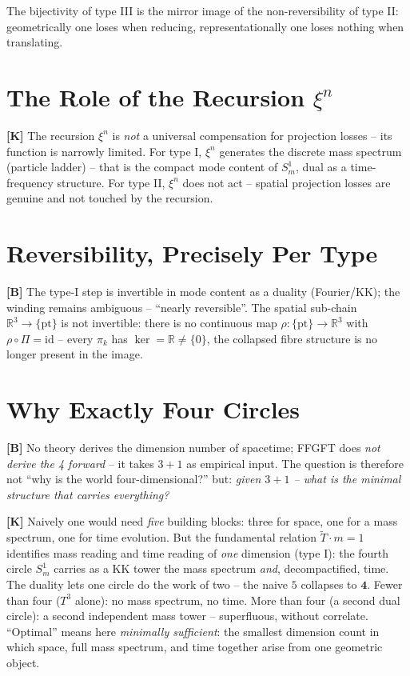The bijectivity of type III is the mirror image of the non-reversibility of type
II: geometrically one loses when reducing, representationally one loses nothing
when translating.

\section{The Role of the Recursion $\xi^n$}

\textbf{[K]} The recursion $\xi^n$ is \emph{not} a universal compensation for
projection losses -- its function is narrowly limited. For type I, $\xi^n$
generates the discrete mass spectrum (particle ladder) -- that is the compact mode
content of $S^1_m$, dual as a time-frequency structure. For type II, $\xi^n$ does
not act -- spatial projection losses are genuine and not touched by the recursion.

\section{Reversibility, Precisely Per Type}

\textbf{[B]} The type-I step is invertible in mode content as a duality
(Fourier/KK); the winding remains ambiguous -- ``nearly reversible''. The spatial
sub-chain $\mathbb{R}^3\to\{\mathrm{pt}\}$ is not invertible: there is no
continuous map $\rho:\{\mathrm{pt}\}\to\mathbb{R}^3$ with $\rho\circ\Pi=\mathrm{id}$
-- every $\pi_k$ has $\ker=\mathbb{R}\neq\{0\}$, the collapsed fibre structure is
no longer present in the image.

\section{Why Exactly Four Circles}

\textbf{[B]} No theory derives the dimension number of spacetime; FFGFT does
\emph{not derive the 4 forward} -- it takes $3+1$ as empirical input. The
question is therefore not ``why is the world four-dimensional?'' but: \emph{given
$3+1$ -- what is the minimal structure that carries everything?}

\textbf{[K]} Naively one would need \emph{five} building blocks: three for space,
one for a mass spectrum, one for time evolution. But the fundamental relation
$\tilde T\cdot m=1$ identifies mass reading and time reading of \emph{one}
dimension (type I): the fourth circle $S^1_m$ carries as a KK tower the mass
spectrum \emph{and}, decompactified, time. The duality lets one circle do the
work of two -- the naive $5$ collapses to $\mathbf{4}$. Fewer than four ($T^3$
alone): no mass spectrum, no time. More than four (a second dual circle): a second
independent mass tower -- superfluous, without correlate. ``Optimal'' means here
\emph{minimally sufficient}: the smallest dimension count in which space, full
mass spectrum, and time together arise from one geometric object.


